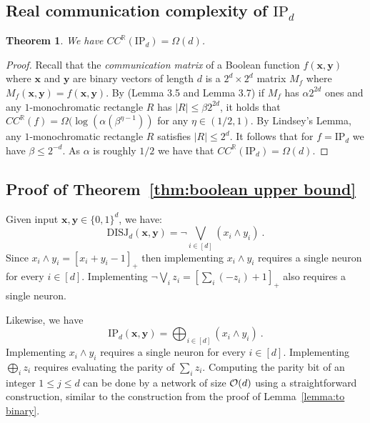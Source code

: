 \documentclass[11pt]{article}
\newtheorem{theorem}{Theorem}[section]
\newcommand{\bx}{\mathbf{x}}
\newcommand{\by}{\mathbf{y}}
\newcommand{\co}{{\cal O}}
\begin{document}
\subsection{Real communication complexity of $\text{IP}_d$}
\label{app:IP real bound}

\begin{theorem}
We have $CC^{\mathbb{R}}(\text{IP}_d) = \Omega(d)$.
\end{theorem}
\begin{proof}
Recall that the \emph{communication matrix} of a Boolean function $f(\bx,\by)$ where $\bx$ and $\by$ are binary vectors of length $d$
is a $2^d \times 2^d$ matrix $M_f$ where $M_f(\bx,\by)=f(\bx,\by)$. By \cite{chattopadhyay2019equality} (Lemma 3.5 and Lemma 3.7) if $M_f$ has $\alpha 2^{2d}$ ones and any
$1$-monochromatic rectangle $R$ has $|R| \leq \beta 2^{2d}$, it holds that $CC^{\mathbb{R}}(f)= \Omega(\log(\alpha (\beta^{\eta-1}))$ for any $\eta \in (1/2,1)$.
By Lindsey's Lemma, any $1$-monochromatic rectangle $R$ satisfies $|R| \leq 2^d$. It follows that for $f=\text{IP}_d$ we have $\beta \leq 2^{-d}$. As $\alpha$ is roughly $1/2$
we have that $CC^{\mathbb{R}}(\text{IP}_d)=\Omega(d)$.
\end{proof}


\subsection{Proof of Theorem~\ref{thm:boolean upper bound}}
\label{app:proof of theorem boolean upper bound}

Given input $\bx,\by \in \{0,1\}^d$, we have:
\[
    \text{DISJ}_d(\bx,\by) = \neg \bigvee_{i \in [d]} (x_i \wedge y_i)~.
\]
Since $x_i \wedge y_i = [x_i+y_i-1]_+$ then implementing $x_i \wedge y_i$ requires a single neuron for every $i \in [d]$. Implementing $\neg \bigvee_i z_i = [\sum_i(-z_i)+1]_+$ also requires a single neuron.

Likewise, we have
\[
    \text{IP}_d(\bx,\by) = \bigoplus_{i \in [d]} (x_i \wedge y_i)~.
\]
Implementing $x_i \wedge y_i$ requires a single neuron for every $i \in [d]$. Implementing $\bigoplus_{i} z_i$ requires evaluating the parity of $\sum_i z_i$. Computing the parity bit of an integer $1 \leq j \leq d$ can be done by a network of size $\co(d)$ using a straightforward construction, similar to the construction from the proof of Lemma~\ref{lemma:to binary}.
\end{document}
